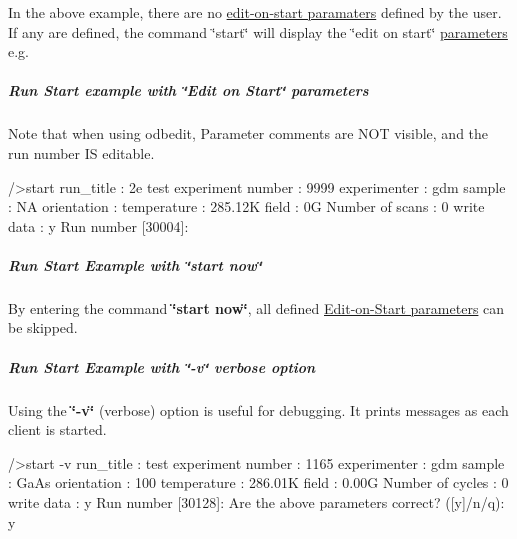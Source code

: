 In the above example, there are no \hyperlink{RC_customize_ODB_RC_Edit_On_Start}{edit-\/on-\/start paramaters} defined by the user. If any are defined, the command \char`\"{}start\char`\"{} will display the \char`\"{}edit on start\char`\"{} \hyperlink{structparameters}{parameters} e.g.\hypertarget{RC_odbedit_examples_RC_EOS_example2}{}\subparagraph{Run Start example with \char`\"{}Edit on Start\char`\"{} parameters}\label{RC_odbedit_examples_RC_EOS_example2}
Note that when using odbedit, Parameter comments are NOT visible, and the run number IS editable. 
\begin{DoxyCode}
/>start 
run_title : 2e test
experiment number : 9999
experimenter : gdm
sample : NA
orientation : 
temperature : 285.12K
field : 0G
Number of scans : 0
write data : y
Run number [30004]:
\end{DoxyCode}


\par
 \hypertarget{RC_odbedit_examples_RC_EOS_example3}{}\subparagraph{Run Start Example with \char`\"{}start now\char`\"{}}\label{RC_odbedit_examples_RC_EOS_example3}
\label{RC_odbedit_examples_RC_odbedit_start_now}
\hypertarget{RC_odbedit_examples_RC_odbedit_start_now}{}
 By entering the command {\bfseries \char`\"{}start now\char`\"{}}, all defined \hyperlink{RC_customize_ODB_RC_Edit_On_Start}{Edit-\/on-\/Start parameters} can be skipped. 
\hypertarget{RC_odbedit_examples_RC_EOS_example4}{}\subparagraph{Run Start Example with \char`\"{}-\/v\char`\"{} verbose option}\label{RC_odbedit_examples_RC_EOS_example4}
\label{RC_odbedit_examples_RC_odbedit_start_v}
\hypertarget{RC_odbedit_examples_RC_odbedit_start_v}{}
 Using the {\bfseries \char`\"{}-\/v\char`\"{}} (verbose) option is useful for debugging. It prints messages as each client is started. 
\begin{DoxyCode}
/>start -v
run_title : test
experiment number : 1165
experimenter : gdm
sample : GaAs
orientation : 100
temperature : 286.01K
field : 0.00G
Number of cycles : 0
write data : y
Run number [30128]:
Are the above parameters correct? ([y]/n/q): y
\end{DoxyCode}
 \label{RC_odbedit_examples_RC_transition_start}
\hypertarget{RC_odbedit_examples_RC_transition_start}{}
 
